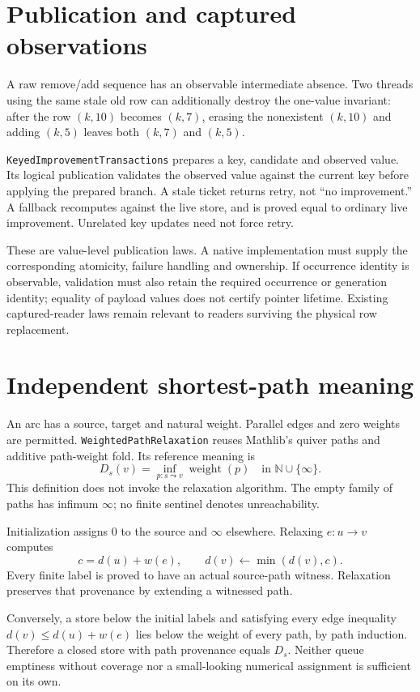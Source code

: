 \documentclass[11pt,a4paper]{article}
\newcommand{\code}[1]{\nolinkurl{#1}}
\begin{document}
\section{Publication and captured observations}

A raw remove/add sequence has an observable intermediate absence. Two
threads using the same stale old row can additionally destroy the one-value
invariant: after the row $(k,10)$ becomes $(k,7)$, erasing the nonexistent
$(k,10)$ and adding $(k,5)$ leaves both $(k,7)$ and $(k,5)$.

\code{KeyedImprovementTransactions} prepares a key, candidate and observed
value. Its logical publication validates the observed value against the
current key before applying the prepared branch. A stale ticket returns
retry, not ``no improvement.'' A fallback recomputes against the live store,
and is proved equal to ordinary live improvement. Unrelated key updates need
not force retry.

These are value-level publication laws. A native implementation must supply
the corresponding atomicity, failure handling and ownership. If occurrence
identity is observable, validation must also retain the required occurrence
or generation identity; equality of payload values does not certify pointer
lifetime. Existing captured-reader laws remain relevant to readers surviving
the physical row replacement.

\section{Independent shortest-path meaning}

An arc has a source, target and natural weight. Parallel edges and zero
weights are permitted. \code{WeightedPathRelaxation} reuses Mathlib's quiver
paths and additive path-weight fold. Its reference meaning is
\[
 D_s(v)=\inf_{p:s\leadsto v}\operatorname{weight}(p)
 \quad\text{in }\mathbb{N}\cup\{\infty\}.
\]
This definition does not invoke the relaxation algorithm. The empty family
of paths has infimum $\infty$; no finite sentinel denotes unreachability.

Initialization assigns $0$ to the source and $\infty$ elsewhere. Relaxing
$e:u\to v$ computes
\[
  c=d(u)+w(e),\qquad d(v)\gets\min(d(v),c).
\]
Every finite label is proved to have an actual source-path witness.
Relaxation preserves that provenance by extending a witnessed path.

Conversely, a store below the initial labels and satisfying every edge
inequality $d(v)\le d(u)+w(e)$ lies below the weight of every path, by path
induction. Therefore a closed store with path provenance equals $D_s$.
Neither queue emptiness without coverage nor a small-looking numerical
assignment is sufficient on its own.
\end{document}
